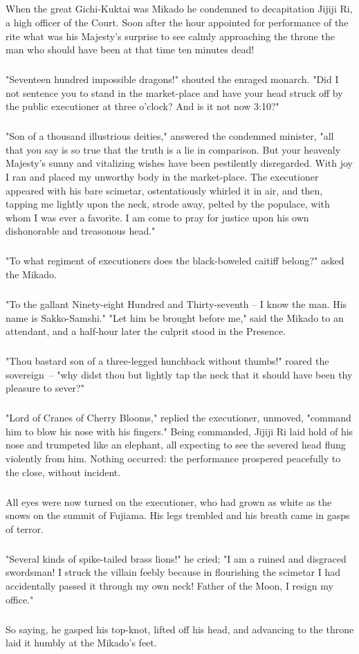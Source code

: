\documentclass[11pt]{article}
\begin{document}
\subparagraph{} When the great Gichi-Kuktai was Mikado he condemned to
  decapitation Jijiji Ri, a high officer of the Court.  Soon after
  the hour appointed for performance of the rite what was his
  Majesty's surprise to see calmly approaching the throne the man
  who should have been at that time ten minutes dead!
\subparagraph{}    "Seventeen hundred impossible dragons!" shouted the enraged
  monarch.  "Did I not sentence you to stand in the market-place and
  have your head struck off by the public executioner at three
  o'clock?  And is it not now 3:10?"
\subparagraph{}    "Son of a thousand illustrious deities," answered the
  condemned minister, "all that you say is so true that the truth is
  a lie in comparison.  But your heavenly Majesty's sunny and
  vitalizing wishes have been pestilently disregarded.  With joy I
  ran and placed my unworthy body in the market-place.  The
  executioner appeared with his bare scimetar, ostentatiously
  whirled it in air, and then, tapping me lightly upon the neck,
  strode away, pelted by the populace, with whom I was ever a
  favorite.  I am come to pray for justice upon his own dishonorable
  and treasonous head."
\subparagraph{}      "To what regiment of executioners does the black-boweled
  caitiff belong?" asked the Mikado.
\subparagraph{}      "To the gallant Ninety-eight Hundred and Thirty-seventh -- I
  know the man.  His name is Sakko-Samshi."
      "Let him be brought before me," said the Mikado to an
  attendant, and a half-hour later the culprit stood in the
  Presence.
\subparagraph{}      "Thou bastard son of a three-legged hunchback without thumbs!"
  roared the sovereign~-- "why didst thou but lightly tap the neck
  that it should have been thy pleasure to sever?"
\subparagraph{}      "Lord of Cranes of Cherry Blooms," replied the executioner,
  unmoved, "command him to blow his nose with his fingers."
      Being commanded, Jijiji Ri laid hold of his nose and trumpeted
  like an elephant, all expecting to see the severed head flung
  violently from him.  Nothing occurred:  the performance prospered
  peacefully to the close, without incident.
\subparagraph{}      All eyes were now turned on the executioner, who had grown as
  white as the snows on the summit of Fujiama.  His legs trembled
  and his breath came in gasps of terror.
\subparagraph{}      "Several kinds of spike-tailed brass lions!" he cried; "I am a
  ruined and disgraced swordsman!  I struck the villain feebly
  because in flourishing the scimetar I had accidentally passed it
  through my own neck!  Father of the Moon, I resign my office."
\subparagraph{}      So saying, he gasped his top-knot, lifted off his head, and
  advancing to the throne laid it humbly at the Mikado's feet.
\end{document}
